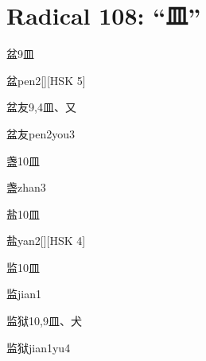
\section*{Radical 108: ``⽫''}

\begin{entry}{盆}{9}{⽫}
  \begin{phonetics}{盆}{pen2}[][HSK 5]
  \end{phonetics}
\end{entry}

\begin{entry}{盆友}{9,4}{⽫、⼜}
  \begin{phonetics}{盆友}{pen2you3}
  \end{phonetics}
\end{entry}

\begin{entry}{盏}{10}{⽫}
  \begin{phonetics}{盏}{zhan3}
  \end{phonetics}
\end{entry}

\begin{entry}{盐}{10}{⽫}
  \begin{phonetics}{盐}{yan2}[][HSK 4]
  \end{phonetics}
\end{entry}

\begin{entry}{监}{10}{⽫}
  \begin{phonetics}{监}{jian1}
  \end{phonetics}
\end{entry}

\begin{entry}{监狱}{10,9}{⽫、⽝}
  \begin{phonetics}{监狱}{jian1yu4}
  \end{phonetics}
\end{entry}

